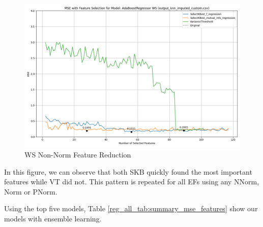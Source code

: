 \documentclass[12pt,letterpaper]{article}
\begin{document}
\begin{figure}
    \centering
    \includegraphics[width=1\linewidth]{reg_section_all/feature_selection_WS_non_norm.png}
    \caption{WS Non-Norm Feature Reduction}
    \label{reg_all_fig:featred_Ex}
\end{figure}
In this figure, we can observe that both \ac{SKB} quickly found the most important features while \ac{VT} did not.
This pattern is repeated for all \ac{EFs} using any NNorm, Norm or PNorm.



Using the top five models, Table \ref{reg_all_tab:summary_mse_features} show our models with ensemble learning.
\end{document}
